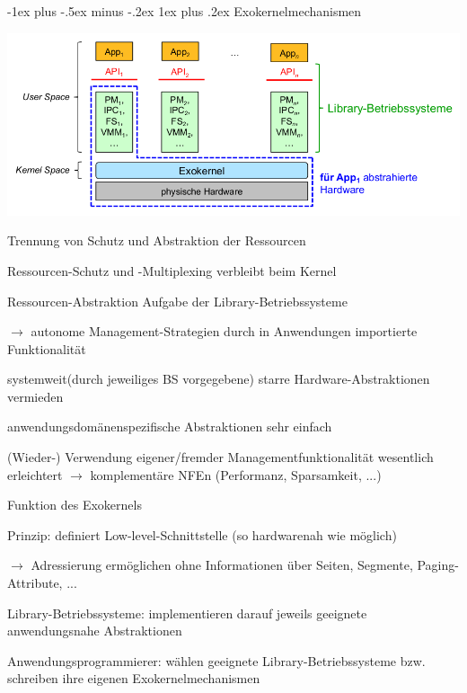 \documentclass[a4paper]{article}
\makeatletter
\renewcommand{\subsubsection}{\@startsection{subsubsection}{3}{0mm}%
 {-1ex plus -.5ex minus -.2ex}%
 {1ex plus .2ex}%
 {\normalfont\small\bfseries}}
\makeatother
\begin{document}
\begin{multicols}{3}
    \subsubsection{Exokernelmechanismen}
    \begin{center}
        \includegraphics[width=.6\linewidth]{Assets/AdvancedOperatingSystems-exokernel-architektur.png}
    \end{center}
    \begin{itemize*}
        \item Trennung von Schutz und Abstraktion der Ressourcen
        \item Ressourcen-Schutz und -Multiplexing verbleibt beim Kernel
        \item Ressourcen-Abstraktion Aufgabe der Library-Betriebssysteme
        \item[$\rightarrow$] autonome Management-Strategien durch in Anwendungen importierte Funktionalität
        \begin{enumerate*}
            \item systemweit(durch jeweiliges BS vorgegebene) starre Hardware-Abstraktionen vermieden
            \item anwendungsdomänenspezifische Abstraktionen sehr einfach
            \item (Wieder-) Verwendung eigener/fremder Managementfunktionalität wesentlich erleichtert $\rightarrow$ komplementäre NFEn (Performanz, Sparsamkeit, ...)
        \end{enumerate*}
        \item Funktion des Exokernels
        \begin{itemize*}
            \item Prinzip: definiert Low-level-Schnittstelle (so hardwarenah wie möglich)
            \item[$\rightarrow$] Adressierung ermöglichen ohne Informationen über Seiten, Segmente, Paging-Attribute, ...
            \item Library-Betriebssysteme: implementieren darauf jeweils geeignete anwendungsnahe Abstraktionen
            \item Anwendungsprogrammierer: wählen geeignete Library-Betriebssysteme bzw. schreiben ihre eigenen Exokernelmechanismen

\end{itemize*}
\end{itemize*}
\end{multicols}
\end{document}
